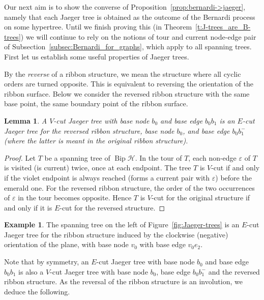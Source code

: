\documentclass[10pt]{amsart}
\newtheorem{lemma}[theo]{Lemma}
\theoremstyle{definition}\newtheorem{defi}[theo]{Definition}
\newtheorem{exam}[theo]{Example}
\theoremstyle{remark}\newtheorem{rema}[theo]{Remark}
\newcommand{\HH}{\mathcal H}
\DeclareMathOperator{\bip}{Bip}
\begin{document}
Our next aim is to show the converse of Proposition~\ref{prop:bernardi->jaeger}, namely that each Jaeger tree is obtained as the outcome of the Bernardi process on some hypertree. Until we finish proving this (in Theorem~\ref{t:J-trees_are_B-trees}) we will continue to rely on the notions of tour and current node-edge pair of Subsection~\ref{subsec:Bernardi_for_graphs}, which apply to all spanning trees. First let us establish some useful properties of Jaeger trees. 

By the \emph{reverse} of a ribbon structure, we mean the structure where all cyclic orders are turned opposite. This is equivalent to reversing the orientation of the ribbon surface. Below we consider the reversed ribbon structure with the same base point, \ie the same boundary point of the ribbon surface.

\begin{lemma}\label{l:emerald_tree_is_also_violet}
A $V$-cut Jaeger tree with base node $b_0$ and base edge $b_0b_1$ is an $E$-cut Jaeger tree for the reversed ribbon structure, base node $b_0$, and base edge $b_0b_1^-$ (where the latter is meant in the original ribbon structure).
\end{lemma}

\begin{proof} 
Let $T$ be a spanning tree of $\bip\HH$. In the tour of $T$, each non-edge $\varepsilon$ of $T$ is visited (\ie is current) twice, once at each endpoint. The tree $T$ is $V$-cut if and only if the violet endpoint is always reached (\ie forms a current pair with $\varepsilon$) before the emerald one. For the reversed ribbon structure, the order of the two occurrences of $\varepsilon$ in the tour becomes opposite. Hence $T$ is $V$-cut for the original structure if and only if it is $E$-cut for the reversed structure.
\end{proof}

\begin{exam} 
The spanning tree on the left of Figure~\ref{fig:Jaeger-trees} is an $E$-cut Jaeger tree for the ribbon structure induced by the clockwise (negative) orientation of the plane, with base node $v_0$ with base edge $v_0e_2$.
\end{exam}

Note that by symmetry, an $E$-cut Jaeger tree with base node $b_0$ and base edge $b_0b_1$ is also a $V$-cut Jaeger tree with base node $b_0$, base edge $b_0b_1^-$ and the reversed ribbon structure. As the reversal of the ribbon structure is an involution, we deduce the following.
\end{document}

